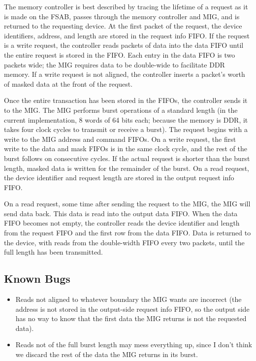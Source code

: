 \documentclass[10pt]{article}
\begin{document}
The memory controller is best described by tracing the lifetime of a request
as it is made on the FSAB, passes through the memory controller and MIG, and
is returned to the requesting device. At the first packet of the request,
the device identifiers, address, and length are stored in the request info
FIFO. If the request is a write request, the controller reads packets of
data into the data FIFO until the entire request is stored in the FIFO. Each
entry in the data FIFO is two packets wide; the MIG requires data to be
double-wide to facilitate DDR memory. If a write request is not aligned, the
controller inserts a packet's worth of masked data at the front of the
request.

Once the entire transaction has been stored in the FIFOs, the controller
sends it to the MIG. The MIG performs burst operations of a standard length
(in the current implementation, 8 words of 64 bits each; because the memory
is DDR, it takes four clock cycles to transmit or receive a burst). The
request begins with a write to the MIG address and command FIFOs. On a write
request, the first write to the data and mask FIFOs is in the same clock
cycle, and the rest of the burst follows on consecutive cycles. If the
actual request is shorter than the burst length, masked data is written for
the remainder of the burst. On a read request, the device identifier and
request length are stored in the output request info FIFO.

On a read request, some time after sending the request to the MIG, the MIG
will send data back. This data is read into the output data FIFO. When the
data FIFO becomes not empty, the controller reads the device identifier and
length from the request FIFO and the first row from the data FIFO. Data is
returned to the device, with reads from the double-width FIFO every two
packets, until the full length has been transmitted.

\subsection{Known Bugs}

\begin{itemize}
\item{Reads not aligned to whatever boundary the MIG wants are incorrect
(the address is not stored in the output-side request info FIFO, so the
output side has no way to know that the first data the MIG returns is not
the requested data).}
\item{Reads not of the full burst length may mess everything up, since I
don't think we discard the rest of the data the MIG returns in its burst.}
\end{itemize}
\end{document}
